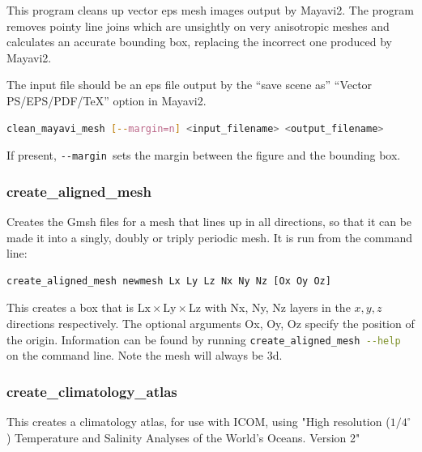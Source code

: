 This program cleans up vector eps mesh images output by Mayavi2. The program
removes pointy line joins which are unsightly on very anisotropic meshes and
calculates an accurate bounding box, replacing the incorrect one produced by Mayavi2.

The input file should be an eps file output by the ``save scene as''
``Vector PS/EPS/PDF/TeX'' option in Mayavi2.

\begin{lstlisting}[language = Bash]
clean_mayavi_mesh [--margin=n] <input_filename> <output_filename>
\end{lstlisting}

If present, \lstinline[language = Bash]+--margin+\ sets the margin between
the figure and the bounding box.


\subsubsection{create\_aligned\_mesh}
\label{sec:create_aligned_mesh}

Creates the Gmsh files for a mesh that lines up in all directions, so that it can be made it into a singly, doubly or triply periodic mesh. It is run from the command line:

\begin{lstlisting}[language = Bash]
create_aligned_mesh newmesh Lx Ly Lz Nx Ny Nz [Ox Oy Oz]
\end{lstlisting}

This creates a box that is $\mathrm{Lx} \times \mathrm{Ly} \times \mathrm{Lz}$ with Nx, Ny, Nz layers in the $x,y,z$ directions respectively. The optional arguments Ox, Oy, Oz  specify the position of the origin. Information can be found by running \lstinline[language = bash]+create_aligned_mesh --help+ on the command line. Note the mesh will always be 3d.


\subsubsection{create\_climatology\_atlas}
\label{sec:create_climatology_atlas}

This creates a climatology atlas, for use with ICOM, using "High resolution ($1/4 ^\circ$) Temperature and Salinity Analyses of the World's Oceans. Version 2"

